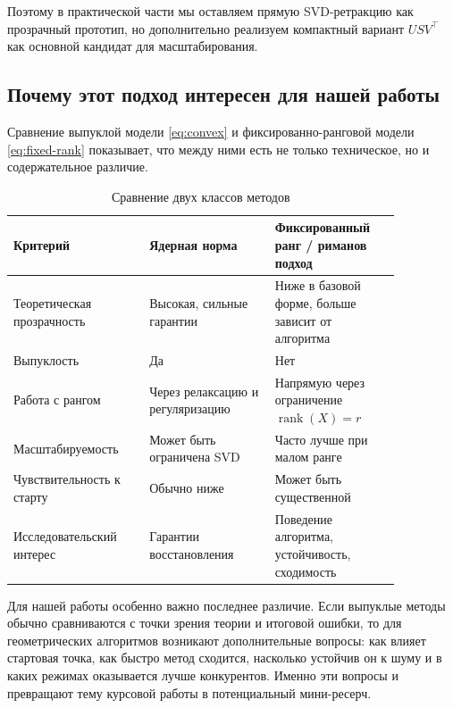 \documentclass[a4paper,12pt]{article}
\newcommand{\rank}{\operatorname{rank}}
\begin{document}
Поэтому в практической части мы оставляем прямую SVD-ретракцию как прозрачный прототип, но дополнительно реализуем компактный вариант $USV^\top$ как основной кандидат для масштабирования.

\subsection{Почему этот подход интересен для нашей работы}

Сравнение выпуклой модели \eqref{eq:convex} и фиксированно-ранговой модели \eqref{eq:fixed-rank} показывает, что между ними есть не только техническое, но и содержательное различие.

\begin{table}[H]
\centering
\caption{Сравнение двух классов методов}
\label{tab:compare}
\begin{tabular}{p{0.30\linewidth} p{0.28\linewidth} p{0.28\linewidth}}
\toprule
\textbf{Критерий} & \textbf{Ядерная норма} & \textbf{Фиксированный ранг / риманов подход} \\
\midrule
Теоретическая прозрачность & Высокая, сильные гарантии & Ниже в базовой форме, больше зависит от алгоритма \\
\addlinespace
Выпуклость & Да & Нет \\
\addlinespace
Работа с рангом & Через релаксацию и регуляризацию & Напрямую через ограничение $\rank(X)=r$ \\
\addlinespace
Масштабируемость & Может быть ограничена SVD & Часто лучше при малом ранге \\
\addlinespace
Чувствительность к старту & Обычно ниже & Может быть существенной \\
\addlinespace
Исследовательский интерес & Гарантии восстановления & Поведение алгоритма, устойчивость, сходимость \\
\bottomrule
\end{tabular}
\end{table}

Для нашей работы особенно важно последнее различие. Если выпуклые методы обычно сравниваются с точки зрения теории и итоговой ошибки, то для геометрических алгоритмов возникают дополнительные вопросы: как влияет стартовая точка, как быстро метод сходится, насколько устойчив он к шуму и в каких режимах оказывается лучше конкурентов. Именно эти вопросы и превращают тему курсовой работы в потенциальный мини-ресерч.

\fi

\newpage
\end{document}
